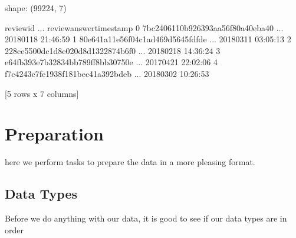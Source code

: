 \documentclass[letterpaper,10pt,english]{jupyterBook}
\begin{document}
\begin{sphinxVerbatim}[commandchars=\\\{\}]
  
  
\end{sphinxVerbatim}

\begin{sphinxVerbatim}[commandchars=\\\{\}]
shape: (99224, 7)
\end{sphinxVerbatim}

\begin{sphinxVerbatim}[commandchars=\\\{\}]
                          review\PYGZus{}id  ... review\PYGZus{}answer\PYGZus{}timestamp
0  7bc2406110b926393aa56f80a40eba40  ...     2018\PYGZhy{}01\PYGZhy{}18 21:46:59
1  80e641a11e56f04c1ad469d5645fdfde  ...     2018\PYGZhy{}03\PYGZhy{}11 03:05:13
2  228ce5500dc1d8e020d8d1322874b6f0  ...     2018\PYGZhy{}02\PYGZhy{}18 14:36:24
3  e64fb393e7b32834bb789ff8bb30750e  ...     2017\PYGZhy{}04\PYGZhy{}21 22:02:06
4  f7c4243c7fe1938f181bec41a392bdeb  ...     2018\PYGZhy{}03\PYGZhy{}02 10:26:53

[5 rows x 7 columns]
\end{sphinxVerbatim}


\section{Preparation}
\label{\detokenize{c7_case_studies/Olist:preparation}}
\sphinxAtStartPar
here we perform tasks to prepare the data in a more pleasing format.


\subsection{Data Types}
\label{\detokenize{c7_case_studies/Olist:data-types}}
\sphinxAtStartPar
Before we do anything with our data, it is good to see if our data types are in order

\begin{sphinxVerbatim}[commandchars=\\\{\}]
\end{sphinxVerbatim}
\end{document}
